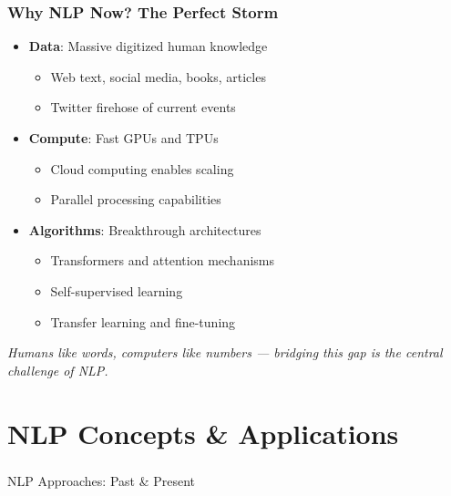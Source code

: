 \begin{frame}[fragile]\frametitle{Why NLP Now? The Perfect Storm}
\begin{itemize}
\item \textbf{Data}: Massive digitized human knowledge
\begin{itemize}
\item Web text, social media, books, articles
\item Twitter firehose of current events
\end{itemize}
\item \textbf{Compute}: Fast GPUs and TPUs
\begin{itemize}
\item Cloud computing enables scaling
\item Parallel processing capabilities
\end{itemize}
\item \textbf{Algorithms}: Breakthrough architectures
\begin{itemize}
\item Transformers and attention mechanisms
\item Self-supervised learning
\item Transfer learning and fine-tuning
\end{itemize}
\end{itemize}
\vspace{0.3cm}
\textit{Humans like words, computers like numbers --- bridging this gap is the central challenge of NLP.}
\end{frame}


\section[Appl]{NLP Concepts \& Applications}
\begin{frame}[fragile]\frametitle{}
\begin{center}
{\Large NLP Approaches: Past \& Present}
\end{center}
\end{frame}

